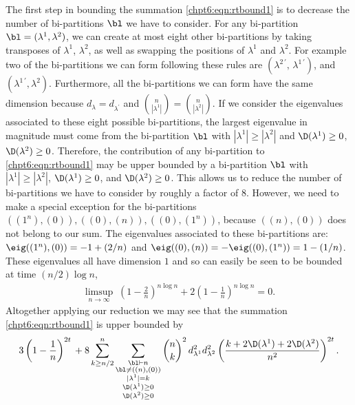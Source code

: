 \documentclass[11pt]{report}
\begin{document}
The first step in bounding the summation \eqref{chpt6:eqn:rtbound1} is to decrease the number of bi-partitions $\bl$ we have to consider.
For any bi-partition $\bl = (\lambda^{1}, \lambda^{2})$, we can create at most eight other bi-partitions by taking transposes of $\lambda^{1}$, $\lambda^{2}$, as well as swapping the positions of $\lambda^{1}$ and $\lambda^{2}$. For example two of the bi-partitions we can form following these rules are $(\lambda^{2 \, \prime}, \,\lambda^{1 \, \prime})$, and $(\lambda^{1 \, \prime}, \lambda^{2} )$. Furthermore, all the bi-partitions we can form have the same dimension because $d_{\lambda} = d_{\lambda^{\prime}}$ and ${n \choose |\lambda^{1}|} = {n \choose |\lambda^{2}|}$. If we consider the eigenvalues associated to these eight possible bi-partitions, the largest eigenvalue in magnitude must come from the bi-partition $\bl$ with $|\lambda^{1}| \geq |\lambda^{2}|$ and $\D(\lambda^{1}) \geq 0$, $\D(\lambda^{2}) \geq 0$. Therefore, the contribution of any bi-partition to \eqref{chpt6:eqn:rtbound1} may be upper bounded by a bi-partition $\bl$ with $|\lambda^{1}| \geq |\lambda^{2}|$, $\D(\lambda^{1}) \geq 0$, and $\D(\lambda^{2}) \geq 0$. 	
This allows us to reduce the number of bi-partitions we have to consider by roughly a factor of $8$. However, we need to make a special exception for the bi-partitions $((1^{n}),(0)), ((0),(n)), ((0),(1^{n}))$, because $((n),(0))$ does not belong to our sum. The eigenvalues associated to these bi-partitions are: $\eig((1^{n}),(0)) = -1 +(2/n)$ and $\eig((0),(n)) = -\eig ((0),(1^{n}))= 1 - (1/n)$. These eigenvalues all have dimension $1$ and so can easily be seen to be bounded at time $(n/2)\log n$,
\begin{eqnarray}
\limsup_{n\to \infty} \; \left( 1 - \frac{2}{n}\right)^{n \log n} + 2\left( 1 - \frac{1}{n}\right)^{n \log n} =0 . \nonumber
\end{eqnarray}
Altogether applying our reduction we may see that the summation \eqref{chpt6:eqn:rtbound1} is upper bounded by
\begin{eqnarray}
3 \left(1 - \frac{1}{n}\right)^{2t}\, +  8 \sum_{k\geq n/2}^{n}   \sum_{\substack{\bl \vdash n \\ \bl \neq ((n),(0)) \\ |\lambda^{1} | = k \\ \D(\lambda^{1}) \geq 0 \\ \D(\lambda^{2}) \geq 0 }} {n \choose k}^{2} \, d_{\lambda^{1}}^{2} d_{\lambda^{2}}^{2} \left( \frac{k +2\D(\lambda^{1})+2\D(\lambda^{2})}{n^{2}}\right)^{2t}. \label{chpt6:eqn:rtbound3}
\end{eqnarray}
\end{document}
